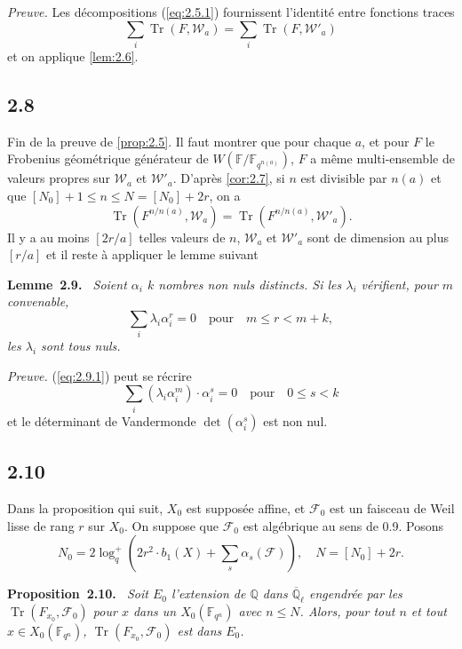 \documentclass[10pt,a4paper]{article}
\makeatletter
\theoremstyle{plain}
\theoremstyle{definition}
\newenvironment{manualblock}[4]{%
  \par\medskip\noindent\textbf{#1~#2#3.}\def\@currentlabel{#2}\label{#4}\itshape\ }{\par\normalfont\medskip}
\DeclareMathOperator{\tr}{Tr}
\makeatother
\begin{document}
\noindent\textit{Preuve.} Les d\'ecompositions (\ref{eq:2.5.1}) fournissent l'identit\'e entre fonctions traces
\[
\sum_i \tr(F, \mathcal{W}_a) = \sum_i \tr(F, \mathcal{W}'_a)
\]
et on applique \ref{lem:2.6}.

\subsection*{2.8}

Fin de la preuve de \ref{prop:2.5}. Il faut montrer que pour chaque $a$, et pour $F$ le Frobenius g\'eom\'etrique g\'en\'erateur de $W(\mathbb{F}/\mathbb{F}_{q^{n(a)}})$, $F$ a m\^eme multi-ensemble de valeurs propres sur $\mathcal{W}_a$ et $\mathcal{W}'_a$. D'apr\`es \ref{cor:2.7}, si $n$ est divisible par $n(a)$ et que $[N_0]+1 \leq n \leq N = [N_0]+2r$, on a
\[
\tr(F^{n/n(a)}, \mathcal{W}_a) = \tr(F^{n/n(a)}, \mathcal{W}'_a).
\]
Il y a au moins $[2r/a]$ telles valeurs de $n$, $\mathcal{W}_a$ et $\mathcal{W}'_a$ sont de dimension au plus $[r/a]$ et il reste \`a appliquer le lemme suivant

\begin{manualblock}{Lemme}{2.9}{}{lem:2.9}
Soient $\alpha_i$ $k$ nombres non nuls distincts. Si les $\lambda_i$ v\'erifient, pour $m$ convenable,
\begin{equation}\label{eq:2.9.1}
\sum_i \lambda_i \alpha_i^r = 0 \quad \text{pour} \quad m \leq r < m+k,
\end{equation}
les $\lambda_i$ sont tous nuls.
\end{manualblock}

\noindent\textit{Preuve.} (\ref{eq:2.9.1}) peut se r\'ecrire
\[
\sum_i (\lambda_i \alpha_i^m) \cdot \alpha_i^s = 0 \quad \text{pour} \quad 0 \leq s < k
\]
et le d\'eterminant de Vandermonde $\det(\alpha_i^s)$ est non nul.

\subsection*{2.10}

Dans la proposition qui suit, $X_0$ est suppos\'ee affine, et $\mathcal{F}_0$ est un faisceau de Weil lisse de rang $r$ sur $X_0$. On suppose que $\mathcal{F}_0$ est alg\'ebrique au sens de 0.9. Posons
\[
N_0 = 2\log_q^+\left(2r^2 \cdot b_1(X) + \sum_s \alpha_s(\mathcal{F})\right), \quad N = [N_0] + 2r.
\]
\begin{manualblock}{Proposition}{2.10}{}{prop:2.10}
Soit $E_0$ l'extension de $\mathbb{Q}$ dans $\overline{\mathbb{Q}}_\ell$ engendr\'ee par les $\tr(F_{x_0}, \mathcal{F}_0)$ pour $x$ dans un $X_0(\mathbb{F}_{q^n})$ avec $n \leq N$. Alors, pour tout $n$ et tout $x \in X_0(\mathbb{F}_{q^n})$, $\tr(F_{x_0}, \mathcal{F}_0)$ est dans $E_0$.
\end{manualblock}
\end{document}
